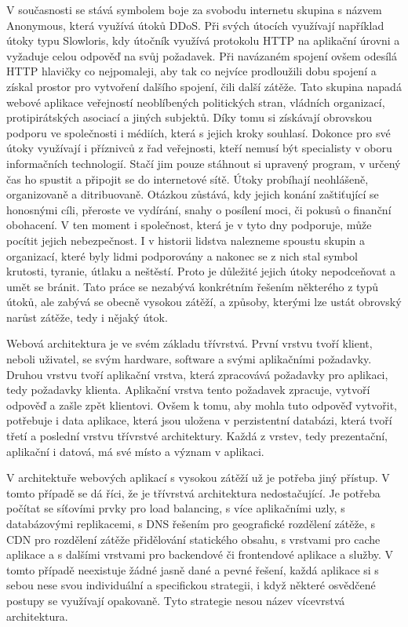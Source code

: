 \documentclass[12pt]{article}
\begin{document}
V současnosti se stává symbolem boje za svobodu internetu skupina s názvem Anonymous, která využívá útoků DDoS. Při svých útocích využívají například útoky typu Slowloris, kdy útočník využívá protokolu HTTP na aplikační úrovni a vyžaduje celou odpověď na svůj požadavek. Při navázaném spojení ovšem odesílá HTTP hlavičky co nejpomaleji, aby tak co nejvíce prodloužili dobu spojení a získal prostor pro vytvoření dalšího spojení, čili další zátěže. Tato skupina napadá webové aplikace veřejností neoblíbených politických stran, vládních organizací, protipirátských asociací a jiných subjektů. Díky tomu si získávají obrovskou podporu ve společnosti i médiích, která s jejich kroky souhlasí. Dokonce pro své útoky využívají i příznivců z řad veřejnosti, kteří nemusí být specialisty v oboru informačních technologií. Stačí jim pouze stáhnout si upravený program, v určený čas ho spustit a připojit se do internetové sítě. Útoky probíhají neohlášeně, organizovaně a ditribuovaně. Otázkou zůstává, kdy jejich konání zaštiťující se honosnými cíli, přeroste ve vydírání, snahy o posílení moci, či pokusů o finanční obohacení. V ten moment i společnost, která je v tyto dny podporuje, může pocítit jejich nebezpečnost. I v historii lidstva nalezneme spoustu skupin a organizací, které byly lidmi podporovány a nakonec se z nich stal symbol krutosti, tyranie, útlaku a neštěstí. Proto je důležité jejich útoky nepodceňovat a umět se bránit. Tato práce se nezabývá konkrétním řešením některého z typů útoků, ale zabývá se obecně vysokou zátěží, a způsoby, kterými lze ustát obrovský narůst zátěže, tedy i nějaký útok. \cite{anonymous}



Webová architektura je ve svém základu třívrstvá. První vrstvu tvoří klient, neboli uživatel, se svým hardware, software a svými aplikačními požadavky. Druhou vrstvu tvoří aplikační vrstva, která zpracovává požadavky pro aplikaci, tedy požadavky klienta. Aplikační vrstva tento požadavek zpracuje, vytvoří odpověď a zašle zpět klientovi. Ovšem k tomu, aby mohla tuto odpověď vytvořit, potřebuje i data aplikace, která jsou uložena v perzistentní databázi, která tvoří třetí a poslední vrstvu třívrstvé architektury. Každá z vrstev, tedy prezentační, aplikační i datová, má své místo a význam v aplikaci.\cite{tri-vrstvy}

\obrazek
{}

V architektuře webových aplikací s vysokou zátěží už je potřeba jiný přístup. V tomto případě se dá říci, že je třívrstvá architektura nedostačující. Je potřeba počítat se síťovími prvky pro load balancing, s více aplikačními uzly, s databázovými replikacemi, s DNS řešením pro geografické rozdělení zátěže, s CDN pro rozdělení zátěže přidělování statického obsahu, s vrstvami pro cache aplikace a s dalšími vrstvami pro backendové či frontendové aplikace a služby. V tomto případě neexistuje žádné jasně dané a pevné řešení, každá aplikace si s sebou nese svou individuální a specifickou strategii, i když některé osvědčené postupy se využívají opakovaně. Tyto strategie nesou název vícevrstvá architektura.
\end{document}
